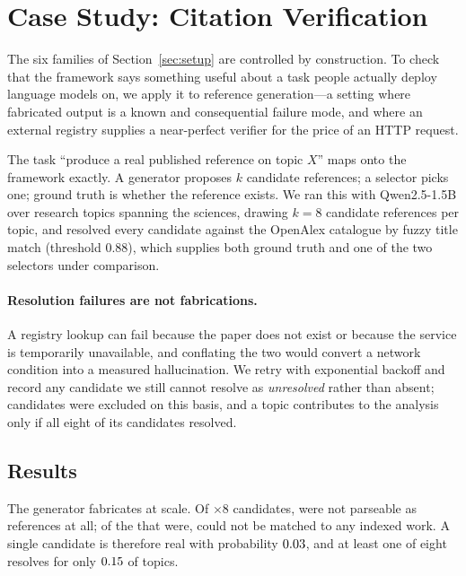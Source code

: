 \section{Case Study: Citation Verification}
\label{sec:casestudy}

The six families of Section~\ref{sec:setup} are controlled by construction. To
check that the framework says something useful about a task people actually
deploy language models on, we apply it to reference generation---a setting
where fabricated output is a known and consequential failure mode, and where an
external registry supplies a near-perfect verifier for the price of an HTTP
request.

The task ``produce a real published reference on topic $X$'' maps onto the
framework exactly. A generator proposes $k$ candidate references; a selector
picks one; ground truth is whether the reference exists. We ran this with
Qwen2.5-1.5B over \nCitTopics{} research topics spanning the sciences, drawing
$k=8$ candidate references per topic, and resolved every candidate against the
OpenAlex catalogue by fuzzy title match (threshold $0.88$), which supplies both
ground truth and one of the two selectors under comparison.

\paragraph{Resolution failures are not fabrications.}
A registry lookup can fail because the paper does not exist or because the
service is temporarily unavailable, and conflating the two would convert a
network condition into a measured hallucination. We retry with exponential
backoff and record any candidate we still cannot resolve as \emph{unresolved}
rather than absent; \nCitUnresolved{} candidates were excluded on this basis,
and a topic contributes to the analysis only if all eight of its candidates
resolved.

\subsection{Results}

The generator fabricates at scale. Of \nCitTopics$\times 8$ candidates,
\citUnparsed{} were not parseable as references at all; of the
\citParseable{} that were, \citHallucRate{} could not be matched to any
indexed work. A single candidate is therefore real with probability
$0.03{}$, and at least one of eight resolves for only $0.15{}$ of
topics.

